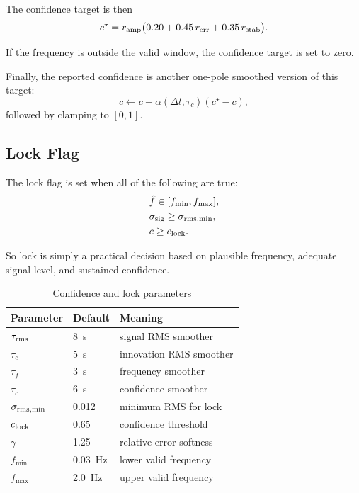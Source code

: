 \documentclass[conference]{IEEEtran}
\begin{document}
The confidence target is then
\begin{equation}
  c^\star =
  r_{\rm amp}\bigl(0.20 + 0.45\,r_{\rm err} + 0.35\,r_{\rm stab}\bigr).
\end{equation}

If the frequency is outside the valid window, the confidence target is set
to zero.

Finally, the reported confidence is another one-pole smoothed version of this
target:
\begin{equation}
  c \leftarrow c + \alpha(\Delta t,\tau_c)(c^\star-c),
\end{equation}
followed by clamping to $[0,1]$.

\subsection{Lock Flag}

The lock flag is set when all of the following are true:
\begin{align}
  &\hat f \in [f_{\min},f_{\max}],\\
  &\sigma_{\rm sig} \ge \sigma_{\rm rms,min},\\
  &c \ge c_{\rm lock}.
\end{align}

So lock is simply a practical decision based on plausible frequency, adequate
signal level, and sustained confidence.

\begin{table}[t]
  \centering
  \caption{Confidence and lock parameters}
  \label{tab:lock}
  \small
  \begin{tabular}{@{}lll@{}}
    \toprule
    Parameter & Default & Meaning \\
    \midrule
    $\tau_{\rm rms}$ & \SI{8}{s} & signal RMS smoother \\
    $\tau_e$ & \SI{5}{s} & innovation RMS smoother \\
    $\tau_f$ & \SI{3}{s} & frequency smoother \\
    $\tau_c$ & \SI{6}{s} & confidence smoother \\
    $\sigma_{\rm rms,min}$ & 0.012 & minimum RMS for lock \\
    $c_{\rm lock}$ & 0.65 & confidence threshold \\
    $\gamma$ & 1.25 & relative-error softness \\
    $f_{\min}$ & \SI{0.03}{Hz} & lower valid frequency \\
    $f_{\max}$ & \SI{2.0}{Hz} & upper valid frequency \\
    \bottomrule
  \end{tabular}
\end{table}
\end{document}

